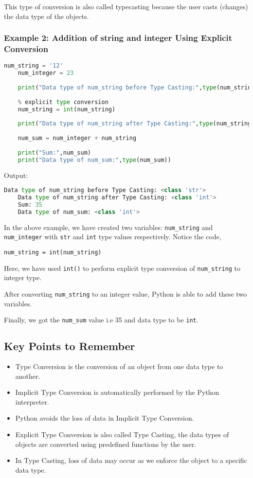 \documentclass{article}
\begin{document}
This type of conversion is also called typecasting because the user casts (changes) the data type of the objects.

\subsubsection{Example 2: Addition of string and integer Using Explicit Conversion}
\begin{lstlisting}[language=Python]
	num_string = '12'
	num_integer = 23
	
	print("Data type of num_string before Type Casting:",type(num_string))
	
	% explicit type conversion
	num_string = int(num_string)
	
	print("Data type of num_string after Type Casting:",type(num_string))
	
	num_sum = num_integer + num_string
	
	print("Sum:",num_sum)
	print("Data type of num_sum:",type(num_sum))
\end{lstlisting}
Output:
\begin{lstlisting}[language=Python]
	Data type of num_string before Type Casting: <class 'str'>
	Data type of num_string after Type Casting: <class 'int'>
	Sum: 35
	Data type of num_sum: <class 'int'>
\end{lstlisting}
In the above example, we have created two variables: \texttt{num\_string} and \texttt{num\_integer} with \texttt{str} and \texttt{int} type values respectively. Notice the code,

\texttt{num\_string = int(num\_string)}

Here, we have used \texttt{int()} to perform explicit type conversion of \texttt{num\_string} to integer type.

After converting \texttt{num\_string} to an integer value, Python is able to add these two variables.

Finally, we got the \texttt{num\_sum} value i.e 35 and data type to be \texttt{int}.

\subsection{Key Points to Remember}
\begin{itemize}
	\item Type Conversion is the conversion of an object from one data type to another.
	\item Implicit Type Conversion is automatically performed by the Python interpreter.
	\item Python avoids the loss of data in Implicit Type Conversion.
	\item Explicit Type Conversion is also called Type Casting, the data types of objects are converted using predefined functions by the user.
	\item In Type Casting, loss of data may occur as we enforce the object to a specific data type.
\end{itemize}
\end{document}
